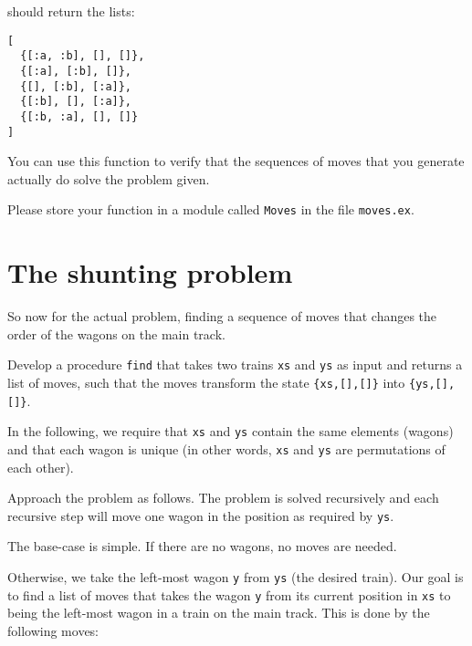 \documentclass[a4paper,11pt]{article}
\begin{document}
should return the lists:

\begin{verbatim}
[
  {[:a, :b], [], []},
  {[:a], [:b], []},
  {[], [:b], [:a]},
  {[:b], [], [:a]},
  {[:b, :a], [], []}
]
\end{verbatim}

You can use this function to verify that the sequences of moves that
you generate actually do solve the problem given.

Please store your function in a module called \verb+Moves+ in the file {\tt moves.ex}.


\section{The shunting problem}

So now for the actual problem, finding a sequence of moves that
changes the order of the wagons on the main track.

Develop a procedure \verb+find+ that takes two trains \verb+xs+
and \verb+ys+ as input and returns a list of moves, such that the
moves transform the state \verb+{xs,[],[]}+ into
\verb+{ys,[],[]}+.

In the following, we require that \verb+xs+ and \verb+ys+ contain the
same elements (wagons) and that each wagon is unique (in other
words, \verb+xs+ and \verb+ys+ are permutations of each other).

Approach the problem as follows. The problem is solved
recursively and each recursive step will move one wagon in the
position as required by \verb+ys+.

The base-case is simple. If there are no wagons, no moves are
needed.

Otherwise, we take the left-most wagon \verb+y+ from \verb+ys+ (the desired
train). Our goal is to find a list of moves that takes the wagon
\verb+y+ from its current position in \verb+xs+ to being the left-most
wagon in a train on the main track. This is done by the following
moves:

\end{document}
